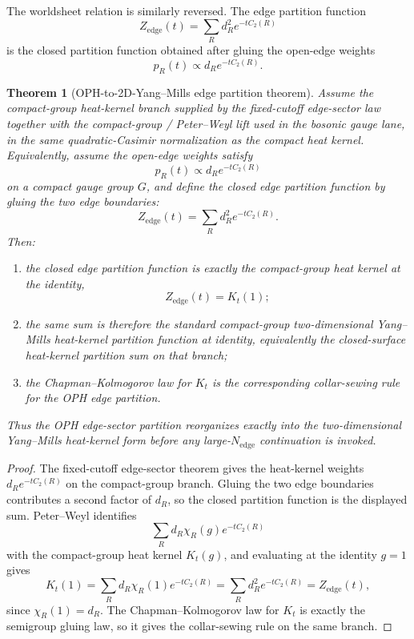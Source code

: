 \documentclass[11pt]{article}
\newtheorem{theorem}{Theorem}[section]
\begin{document}
The worldsheet relation is similarly reversed. The edge partition function
\[
Z_{\mathrm{edge}}(t)=\sum_R d_R^2 e^{-t C_2(R)}
\]
is the closed partition function obtained after gluing the open-edge weights
\[
p_R(t)\propto d_R e^{-tC_2(R)}.
\]

\begin{theorem}[OPH-to-2D-Yang--Mills edge partition theorem]\label{thm:edge-2dym}
Assume the compact-group heat-kernel branch supplied by the fixed-cutoff edge-sector law together
with the compact-group / Peter--Weyl lift used in the bosonic gauge lane, in the same
quadratic-Casimir normalization as the compact heat kernel. Equivalently, assume the open-edge
weights satisfy
\[
p_R(t)\propto d_R e^{-tC_2(R)}
\]
on a compact gauge group \(G\), and define the closed edge partition function by gluing the two
edge boundaries:
\[
Z_{\mathrm{edge}}(t)=\sum_R d_R^2 e^{-tC_2(R)}.
\]
Then:
\begin{enumerate}[label=\textup{(\roman*)},leftmargin=2em]
\item the closed edge partition function is exactly the compact-group heat kernel at the identity,
\[
Z_{\mathrm{edge}}(t)=K_t(1);
\]
\item the same sum is therefore the standard compact-group two-dimensional Yang--Mills
heat-kernel partition function at identity, equivalently the closed-surface heat-kernel partition
sum on that branch;
\item the Chapman--Kolmogorov law for \(K_t\) is the corresponding collar-sewing rule for the OPH
edge partition.
\end{enumerate}
Thus the OPH edge-sector partition reorganizes exactly into the two-dimensional Yang--Mills
heat-kernel form before any large-\(N_{\mathrm{edge}}\) continuation is invoked.
\end{theorem}

\begin{proof}
The fixed-cutoff edge-sector theorem gives the heat-kernel weights \(d_R e^{-tC_2(R)}\) on the
compact-group branch. Gluing the two edge boundaries contributes a second factor of \(d_R\), so the
closed partition function is the displayed sum. Peter--Weyl identifies
\[
\sum_R d_R \chi_R(g)e^{-tC_2(R)}
\]
with the compact-group heat kernel \(K_t(g)\), and evaluating at the identity \(g=1\) gives
\[
K_t(1)=\sum_R d_R \chi_R(1)e^{-tC_2(R)}=\sum_R d_R^2 e^{-tC_2(R)}=Z_{\mathrm{edge}}(t),
\]
since \(\chi_R(1)=d_R\). The Chapman--Kolmogorov law for \(K_t\) is exactly the semigroup gluing
law, so it gives the collar-sewing rule on the same branch.
\end{proof}
\end{document}
